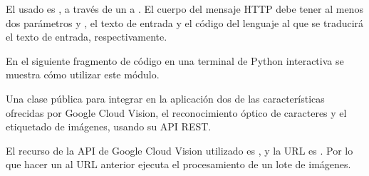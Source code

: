 El usado es , a través de un  a
. El cuerpo
del mensaje HTTP debe tener al menos dos parámetros  y ,
el texto de entrada y el código del lenguaje al que se traducirá el texto
de entrada, respectivamente.

En el siguiente fragmento de código en una terminal de Python interactiva
se muestra cómo utilizar este módulo.

\begin{sphinxVerbatim}[commandchars=\\\{\}]
   
  
 
\end{sphinxVerbatim}

\label{\detokenize{chapter_two/desc_cloudnao:module-app.tpa_client_libraries.google_cloud_vision}}\label{\detokenize{chapter_two/desc_cloudnao:module-google_cloud_vision}}


Una clase pública para integrar en la aplicación dos de las características
ofrecidas por Google Cloud Vision, el reconocimiento óptico de caracteres y
el etiquetado de imágenes, usando su API REST.

El recurso de la API de Google Cloud Vision utilizado es ,
y la URL es
. Por lo que hacer
un  al URL anterior ejecuta el procesamiento de un lote de imágenes.

